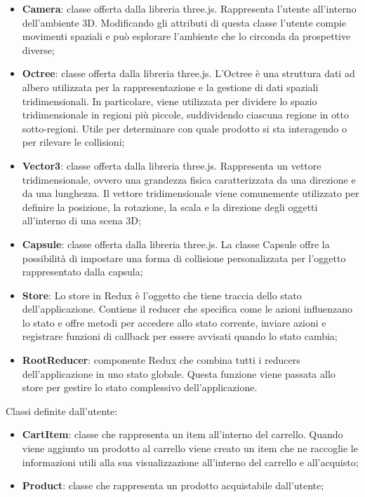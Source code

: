 \begin{itemize}
\begin{itemize}
			\item \textbf{Camera}: classe offerta dalla libreria three.js.
			Rappresenta l'utente all'interno dell'ambiente 3D.
			Modificando gli attributi di questa classe l'utente compie movimenti spaziali e può esplorare l'ambiente che 
			lo circonda da prospettive diverse;
			\item \textbf{Octree}: classe offerta dalla libreria three.js.
			L'Octree è una struttura dati ad albero utilizzata per la rappresentazione e la gestione di dati spaziali 
			tridimensionali. 
			In particolare, viene utilizzata per dividere lo spazio tridimensionale in regioni più piccole, 
			suddividendo ciascuna regione in otto sotto-regioni.
			Utile per determinare con quale prodotto si sta interagendo o per rilevare le collisioni;
			\item \textbf{Vector3}: classe offerta dalla libreria three.js.
			Rappresenta un vettore tridimensionale, ovvero una grandezza fisica caratterizzata da una direzione e da una lunghezza.
			Il vettore tridimensionale viene comunemente utilizzato per definire la posizione, la rotazione, 
			la scala e la direzione degli oggetti all'interno di una scena 3D;
			\item \textbf{Capsule}: classe offerta dalla libreria three.js.
			La classe Capsule offre la possibilità di impostare una forma di collisione personalizzata 
			per l'oggetto rappresentato dalla capsula; 
			\item \textbf{Store}: Lo store in Redux è l'oggetto che tiene traccia dello stato dell'applicazione. 
			Contiene il reducer che specifica come le azioni influenzano lo stato e offre metodi per accedere allo stato corrente, 
			inviare azioni e registrare funzioni di callback per essere avvisati quando lo stato cambia;
			\item \textbf{RootReducer}: componente Redux che combina tutti i reducers dell'applicazione in uno stato globale. 
			Questa funzione viene passata allo store per gestire lo stato complessivo dell'applicazione.
		\end{itemize}
		Classi definite dall'utente:
		\begin{itemize}
			\item \textbf{CartItem}: classe che rappresenta un item all'interno del carrello.
			Quando viene aggiunto un prodotto al carrello viene creato un item che ne raccoglie le informazioni utili 
			alla sua visualizzazione all'interno del carrello e all'acquisto;
			\item \textbf{Product}: classe che rappresenta un prodotto acquistabile dall'utente;

\end{itemize}
\end{itemize}
